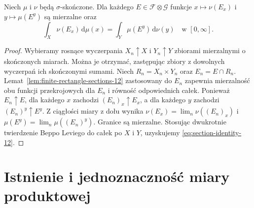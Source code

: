 \begin{twierdzenie}
\label{thm:section-identity-12}
Niech $\mu$ i $\nu$ będą $\sigma$-skończone.
Dla każdego $E\in\mathcal F\otimes\mathcal G$
funkcje $x\mapsto\nu(E_x)$ i $y\mapsto\mu(E^y)$
są mierzalne oraz
\begin{equation}\label{eq:section-identity-12}
\int_X\nu(E_x)\,\mathrm d\mu(x)
=\int_Y\mu(E^y)\,\mathrm d\nu(y)
\quad\text{w }[0,\infty].
\end{equation}
\end{twierdzenie}
\begin{proof}
Wybieramy rosnące wyczerpania
$X_n\uparrow X$ i $Y_n\uparrow Y$ zbiorami mierzalnymi
o skończonych miarach. Można je otrzymać, zastępując
zbiory z dowolnych wyczerpań ich skończonymi sumami.
Niech $R_n=X_n\times Y_n$ oraz $E_n=E\cap R_n$.
Lemat~\ref{lem:finite-rectangle-sections-12}
zastosowany do $E_n$ zapewnia mierzalność obu
funkcji przekrojowych dla $E_n$ i równość odpowiednich
całek. Ponieważ $E_n\uparrow E$, dla każdego $x$
zachodzi $(E_n)_x\uparrow E_x$, a dla każdego $y$
zachodzi $(E_n)^y\uparrow E^y$. Z ciągłości miary
z dołu wynika
$\nu(E_x)=\lim_n\nu((E_n)_x)$ i
$\mu(E^y)=\lim_n\mu((E_n)^y)$. Granice są
mierzalne. Stosując dwukrotnie twierdzenie
Beppo Leviego do całek po $X$ i $Y$, uzyskujemy
\eqref{eq:section-identity-12}.
\end{proof}

\section{Istnienie i jednoznaczność miary produktowej}

